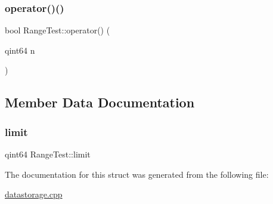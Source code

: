 \subsubsection{\texorpdfstring{operator()()}{operator()()}}
{\footnotesize\ttfamily bool Range\+Test\+::operator() (\begin{DoxyParamCaption}\item[{qint64}]{n }\end{DoxyParamCaption})\hspace{0.3cm}{\ttfamily [inline]}}



\subsection{Member Data Documentation}
\mbox{\label{struct_range_test_a638ebd61c0447db219f10cd1473ab364}} 
\subsubsection{\texorpdfstring{limit}{limit}}
{\footnotesize\ttfamily qint64 Range\+Test\+::limit}



The documentation for this struct was generated from the following file\+:\begin{DoxyCompactItemize}
\item 
\mbox{\hyperlink{datastorage_8cpp}{datastorage.\+cpp}}\end{DoxyCompactItemize}
